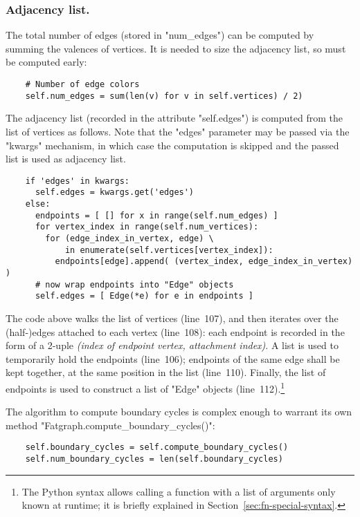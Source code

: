 \subsubsection{Adjacency list.}
The total number of edges (stored in "num_edges") can be computed by
summing the valences of vertices.  It is needed to size the adjacency
list, so must be computed early:
\begin{lstlisting}
    # Number of edge colors
    self.num_edges = sum(len(v) for v in self.vertices) / 2)

\end{lstlisting}
The adjacency list (recorded in the attribute "self.edges") is computed
from the list of vertices as follows.  Note that the "edges" parameter
may be passed via the "kwargs" mechanism, in which case the
computation is skipped and the passed list is used as adjacency list.
\begin{lstlisting}
    if 'edges' in kwargs:
      self.edges = kwargs.get('edges')
    else:
      endpoints = [ [] for x in range(self.num_edges) ]
      for vertex_index in range(self.num_vertices):
        for (edge_index_in_vertex, edge) \
            in enumerate(self.vertices[vertex_index]):
          endpoints[edge].append( (vertex_index, edge_index_in_vertex) )
      # now wrap endpoints into "Edge" objects
      self.edges = [ Edge(*e) for e in endpoints ]

\end{lstlisting}
The code above walks the list of vertices (line~107), and then
iterates over the (half-)edges attached to each vertex (line~108):
each endpoint is recorded in the form of a 2-uple \emph{(index of
  endpoint vertex, attachment index)}. A list is used to temporarily
hold the endpoints (line~106); endpoints of the same edge shall be
kept together, at the same position in the list (line~110). Finally,
the list of endpoints is used to construct a list of "Edge" objects
(line~112).\footnote{The Python syntax \q{Edge(*e)} allows calling a
  function with a list of arguments only known at runtime; it is
  briefly explained in Section~\ref{sec:fn-special-syntax}.}

The algorithm to compute boundary cycles is complex enough to warrant
its own method "Fatgraph.compute_boundary_cycles()":
\begin{lstlisting}
    self.boundary_cycles = self.compute_boundary_cycles()
    self.num_boundary_cycles = len(self.boundary_cycles)

\end{lstlisting}

